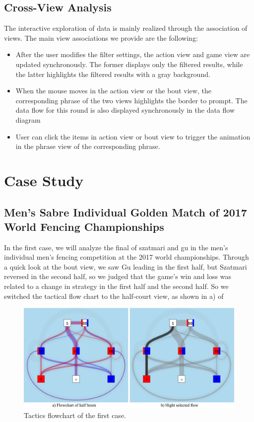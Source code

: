 \documentclass[journal]{vgtc}                %
\begin{document}
\subsection{Cross-View Analysis}
The interactive exploration of data is mainly realized through the association of views.
The main view associations we provide are the following:
\begin{itemize}
	\item After the user modifies the filter settings, the action view and game view are updated synchronously.
	The former displays only the filtered results, while the latter highlights the filtered results with a gray background.
	\item When the mouse moves in the action view or the bout view, the corresponding phrase of the two views highlights the border to prompt.
	The data flow for this round is also displayed synchronously in the data flow diagram
	\item User can click the items in action view or bout view to trigger the animation in the phrase view of the corresponding phrase.
\end{itemize}
\section{Case Study}
\subsection{Men's Sabre Individual Golden Match of 2017 World Fencing Championships}
In the first case, we will analyze the final of szatmari and gu in the men's individual men's fencing competition at the 2017 world championships.
Through a quick look at the bout view, we saw Gu leading in the first half, but Szatmari reversed in the second half, so we judged that the game's win and loss was related to a change in strategy in the first half and the second half.
So we switched the tactical flow chart to the half-court view, as shown in a) of \author{fig:case1}
\begin{figure}[tb]
	\centering
	\includegraphics[width=\linewidth]{case1}
	\caption{Tactics flowchart of the first case.}
	\label{fig:case1}
\end{figure}
\end{document}
